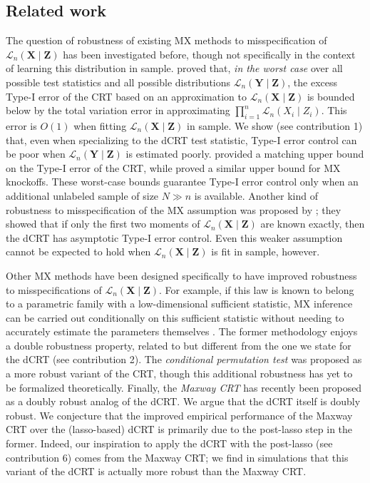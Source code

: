 \documentclass[aos]{imsart}
\theoremstyle{plain}
\theoremstyle{remark}
\newcommand{\prx}{\bm X}								%
\newcommand{\srx}{X}									%
\newcommand{\prz}{\bm Z}								%
\newcommand{\srz}{Z}									%
\newcommand{\pry}{{\bm Y}}								%
\newcommand{\law}{\mathcal L}							%
\begin{document}
\subsection{Related work}

The question of robustness of existing MX methods to misspecification of $\law_n(\prx \mid \prz)$ has been investigated before, though not specifically in the context of learning this distribution in sample. \citet{Berrett2019} proved that, \textit{in the worst case} over all possible test statistics and all possible distributions $\law_n(\pry \mid \prz)$, the excess Type-I error of the CRT based on an approximation to $\law_n(\prx \mid \prz)$ is bounded below by the total variation error in approximating $\prod_{i = 1}^n \law_n(\srx_i \mid \srz_i)$. This error is $O(1)$ when fitting $\law_n(\prx \mid \prz)$ in sample. We show (see contribution 1) that, even when specializing to the dCRT test statistic, Type-I error control can be poor when $\law_n(\pry \mid \prz)$ is estimated poorly. \cite{Berrett2019} provided a matching upper bound on the Type-I error of the CRT, while \citet{Barber2018} proved a similar upper bound for MX knockoffs. These worst-case bounds guarantee Type-I error control only when an additional unlabeled sample of size $N \gg n$ is available. Another kind of robustness to misspecification of the MX assumption was proposed by \citet{Katsevich2020a}; they showed that if only the first two moments of $\law_n(\prx \mid \prz)$ are known exactly, then the dCRT has asymptotic Type-I error control. Even this weaker assumption cannot be expected to hold when $\law_n(\prx \mid \prz)$ is fit in sample, however.

Other MX methods have been designed specifically to have improved robustness to misspecifications of $\law_n(\prx \mid \prz)$. For example, if this law is known to belong to a parametric family with a low-dimensional sufficient statistic, MX inference can be carried out conditionally on this sufficient statistic without needing to accurately estimate the parameters themselves \citep{Huang2019,Barber2020}. The former methodology enjoys a double robustness property, related to but different from the one we state for the dCRT (see contribution 2). The \textit{conditional permutation test} \citep{Berrett2019} was proposed as a more robust variant of the CRT, though this additional robustness has yet to be formalized theoretically. Finally, the \textit{Maxway CRT} \citep{Li2022} has recently been proposed as a doubly robust analog of the dCRT. We argue that the dCRT itself is doubly robust. We conjecture that the improved empirical performance of the Maxway CRT over the (lasso-based) dCRT is primarily due to the post-lasso step in the former. Indeed, our inspiration to apply the dCRT with the post-lasso (see contribution 6) comes from the Maxway CRT; we find in simulations that this variant of the dCRT is actually more robust than the Maxway CRT.
\end{document}
